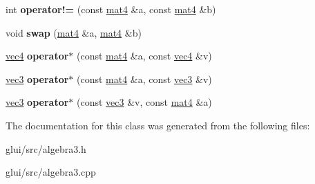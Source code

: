\begin{DoxyCompactItemize}
\item 
\hypertarget{classmat4_a43bfd79a43b2d40a3afa8f80318325ea}{int {\bfseries operator!=} (const \hyperlink{classmat4}{mat4} \&a, const \hyperlink{classmat4}{mat4} \&b)}\label{classmat4_a43bfd79a43b2d40a3afa8f80318325ea}

\item 
\hypertarget{classmat4_af7bc191797f0f9e2eaf21918bfac24f8}{void {\bfseries swap} (\hyperlink{classmat4}{mat4} \&a, \hyperlink{classmat4}{mat4} \&b)}\label{classmat4_af7bc191797f0f9e2eaf21918bfac24f8}

\item 
\hypertarget{classmat4_a0252c203e5a77099da7fd04c576ed437}{\hyperlink{classvec4}{vec4} {\bfseries operator$\ast$} (const \hyperlink{classmat4}{mat4} \&a, const \hyperlink{classvec4}{vec4} \&v)}\label{classmat4_a0252c203e5a77099da7fd04c576ed437}

\item 
\hypertarget{classmat4_a3a7a7dfc514a58f3c889b48fa4745815}{\hyperlink{classvec3}{vec3} {\bfseries operator$\ast$} (const \hyperlink{classmat4}{mat4} \&a, const \hyperlink{classvec3}{vec3} \&v)}\label{classmat4_a3a7a7dfc514a58f3c889b48fa4745815}

\item 
\hypertarget{classmat4_ac87402f559c51cd778b6012774481c39}{\hyperlink{classvec3}{vec3} {\bfseries operator$\ast$} (const \hyperlink{classvec3}{vec3} \&v, const \hyperlink{classmat4}{mat4} \&a)}\label{classmat4_ac87402f559c51cd778b6012774481c39}

\end{DoxyCompactItemize}


The documentation for this class was generated from the following files\-:\begin{DoxyCompactItemize}
\item 
glui/src/algebra3.\-h\item 
glui/src/algebra3.\-cpp\end{DoxyCompactItemize}
